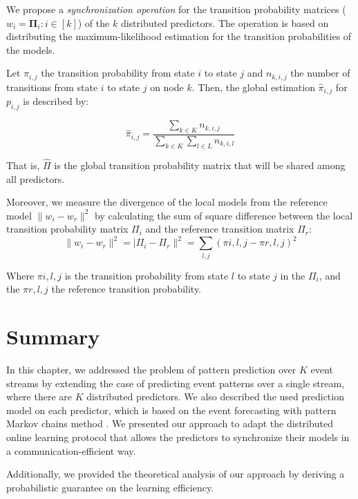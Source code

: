 \par We propose a \textit{synchronization operation} for the transition probability matrices ($w_i=\boldsymbol{\Pi}_i :i \in[k]$) of the $k$ distributed \pmcmr predictors. The operation is based on distributing the maximum-likelihood estimation \cite{anderson1957statistical} for the transition probabilities of the \pmcmr models. 
\par Let $\pi_{i,j}$ the transition probability from state $i$ to state $j$ 
and $n_{k,i,j}$ the number of transitions from state $i$ to state $j$ on node $k$. Then, the global estimation $\hat{\pi}_{i,j}$ for $p_{i,j}$ is described by:

\begin{equation}
\label{eq:dis_pi_estim}
\hat{\pi}_{i,j} = \frac{\sum_{k \in K} n_{k,i,j}}{\sum_{k \in K} \sum_{l \in L} n_{k,i,l}}
\end{equation}

That is,  $\hat{\Pi}$ is the global transition probability matrix that will be shared among all \pmcmr predictors. 
\par Moreover, we measure the divergence of the local models from the reference model $\|w_i - w_r\|^2$ by calculating the sum of square difference between the local transition probability matrix $\Pi_i$ and the reference transition matrix $\Pi_r$:
\begin{equation*}
\label{eq:dis_pi_varinace}
\|w_i - w_r\|^2=|\Pi_i - \Pi_r\|^2=\sum_{l,j} (\pi{i,l,j} -\pi{r,l,j})^2
\end{equation*}

Where $\pi{i,l,j}$ is the transition probability from state $l$ to state $j$ in the $\Pi_i$, and the $\pi{r,l,j}$ the reference transition probability.



\section{Summary}

\par In this chapter, we addressed the problem of pattern prediction over \emph{$K$} event streams by extending the case of predicting  event patterns over a single stream, where there are \emph{$K$} distributed predictors.  We also described the used prediction model on each predictor, which is based on the event forecasting with pattern Markov chains method \cite{alevizos2017event}. We presented our approach to adapt the distributed online learning protocol \cite{kamp2014communication} that allows the predictors to synchronize their models in a communication-efficient way. 
\par Additionally, we provided the theoretical analysis of our approach by deriving a probabilistic guarantee on the learning efficiency. 
 
